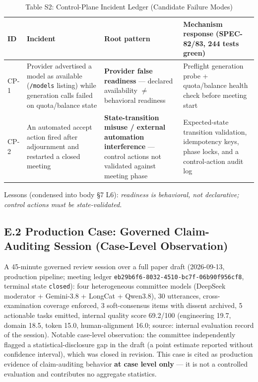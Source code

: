 \documentclass[11pt,a4paper]{article}
\begin{document}
\begin{table}[htbp]
\caption{Table S2: Control-Plane Incident Ledger (Candidate Failure Modes)}
\centering
\small
\begin{tabularx}{\textwidth}{l>{\raggedright\arraybackslash}p{2.5cm}>{\raggedright\arraybackslash}p{4cm}>{\raggedright\arraybackslash}X}
\toprule
ID & Incident & Root pattern & Mechanism response (SPEC-82/83, 244 tests green) \\
\midrule
CP-1 & Provider advertised a model as available (\texttt{/models} listing) while generation calls failed on quota/balance state & \textbf{Provider false readiness} --- declared availability $\neq$ behavioral readiness & Preflight generation probe + quota/balance health check before meeting start \\
\addlinespace
CP-2 & An automated accept action fired after adjournment and restarted a closed meeting & \textbf{State-transition misuse / external automation interference} --- control actions not validated against meeting phase & Expected-state transition validation, idempotency keys, phase locks, and a control-action audit log \\
\bottomrule
\end{tabularx}
\end{table}

Lessons (condensed into body §7 L6): \emph{readiness is behavioral, not declarative; control actions must be state-validated.}

\subsection*{E.2 Production Case: Governed Claim-Auditing Session (Case-Level Observation)}

A 45-minute governed review session over a full paper draft (2026-09-13, production pipeline; meeting ledger \texttt{eb29b6f6-8032-4510-bc7f-06b90f956cf8}, terminal state \texttt{closed}): four heterogeneous committee models (DeepSeek moderator + Gemini-3.8 + LongCat + Qwen3.8), 30 utterances, cross-examination coverage enforced, 3 soft-consensus items with dissent archived, 5 actionable tasks emitted, internal quality score 69.2/100 (engineering 19.7, domain 18.5, token 15.0, human-alignment 16.0; source: internal evaluation record of the session). Notable case-level observation: the committee independently flagged a statistical-disclosure gap in the draft (a point estimate reported without confidence interval), which was closed in revision. This case is cited as production evidence of claim-auditing behavior \textbf{at case level only} --- it is not a controlled evaluation and contributes no aggregate statistics.
\end{document}

